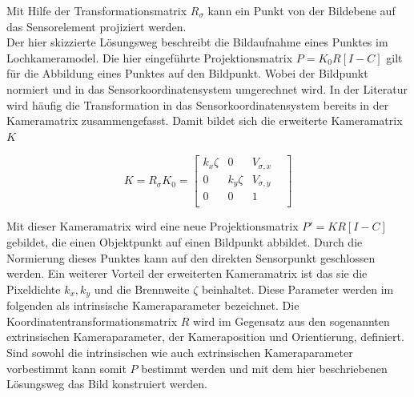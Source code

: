 Mit Hilfe der Transformationsmatrix $R_\sigma$ kann ein Punkt von der Bildebene auf das Sensorelement projiziert werden.\\

Der hier skizzierte Lösungsweg beschreibt die Bildaufnahme eines Punktes im Lochkameramodel. Die hier eingeführte Projektionsmatrix $P=K_0R[I -C]$ gilt für die Abbildung eines Punktes auf den Bildpunkt. Wobei der Bildpunkt normiert und in das Sensorkoordinatensystem umgerechnet wird. In der Literatur wird häufig die Transformation in das Sensorkoordinatensystem bereits in der Kameramatrix zusammengefasst. Damit bildet sich die erweiterte Kameramatrix $K$

\begin{equation}
K=	R_\sigma K_0=  \begin{bmatrix}
k_x \zeta & 0 & V_{\sigma,x}\\
0 & k_y \zeta & V_{\sigma,y}\\
0 & 0   & 1 &\\
\end{bmatrix}
\end{equation}

Mit dieser Kameramatrix wird eine neue Projektionsmatrix $P'=KR[I -C]$ gebildet, die einen Objektpunkt auf einen Bildpunkt abbildet. Durch die Normierung dieses Punktes kann auf den direkten Sensorpunkt geschlossen werden. 
Ein weiterer Vorteil der erweiterten Kameramatrix ist das sie die Pixeldichte $k_x,k_y$ und die Brennweite $\zeta$ beinhaltet. Diese Parameter werden im folgenden als intrinsische Kameraparameter bezeichnet. Die Koordinatentransformationsmatrix $R$ wird im Gegensatz aus den sogenannten extrinsischen Kameraparameter, der Kameraposition und Orientierung, definiert. Sind sowohl die intrinsischen wie auch extrinsischen Kameraparameter vorbestimmt kann somit $P$ bestimmt werden und mit dem hier beschriebenen Lösungsweg das Bild konstruiert werden. %





